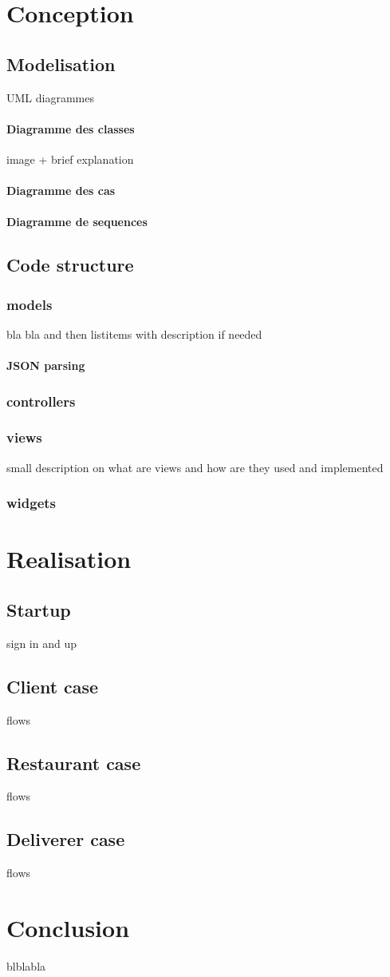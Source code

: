 \documentclass[a4paper, 10p]{report}
\begin{document}
\newpage
\chapter{Conception}
	\section{Modelisation} UML diagrammes
		\subsubsection{Diagramme des classes} image + brief explanation
		\subsubsection{Diagramme des cas}
		\subsubsection{Diagramme de sequences}
	\section{Code structure}
		\subsection{models} %
			bla bla and then listitems with description if needed
			\subsubsection{JSON parsing}
		\subsection{controllers}
		\subsection{views}
		small description on what are views and how are they used and implemented
		\subsection{widgets}
		
\newpage
\chapter{Realisation}
	\section{Startup} sign in and up
	\section{Client case} flows
	\section{Restaurant case} flows
	\section{Deliverer case} flows

\newpage
\chapter*{Conclusion}
blblabla

\newpage
\begin{thebibliography}{300}
\end{thebibliography}
\end{document}
